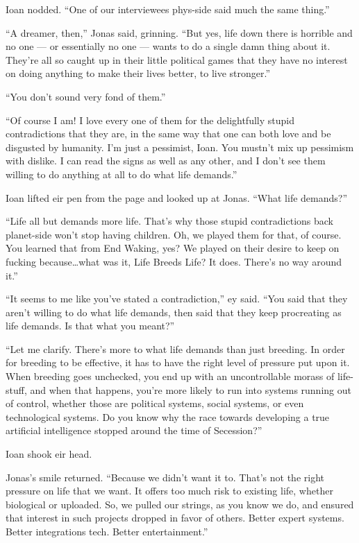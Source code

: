 Ioan nodded. ``One of our interviewees phys-side said much the same thing.''

``A dreamer, then,'' Jonas said, grinning. ``But yes, life down there is horrible and no one — or essentially no one — wants to do a single damn thing about it. They're all so caught up in their little political games that they have no interest on doing anything to make their lives better, to live stronger.''

``You don't sound very fond of them.''

``Of course I am! I love every one of them for the delightfully stupid contradictions that they are, in the same way that one can both love and be disgusted by humanity. I'm just a pessimist, Ioan. You mustn't mix up pessimism with dislike. I can read the signs as well as any other, and I don't see them willing to do anything at all to do what life demands.''

Ioan lifted eir pen from the page and looked up at Jonas. ``What life demands?''

``Life all but demands more life. That's why those stupid contradictions back planet-side won't stop having children. Oh, we played them for that, of course. You learned that from End Waking, yes? We played on their desire to keep on fucking because\ldots what was it, Life Breeds Life? It does. There's no way around it.''

``It seems to me like you've stated a contradiction,'' ey said. ``You said that they aren't willing to do what life demands, then said that they keep procreating as life demands. Is that what you meant?''

``Let me clarify. There's more to what life demands than just breeding. In order for breeding to be effective, it has to have the right level of pressure put upon it. When breeding goes unchecked, you end up with an uncontrollable morass of life-stuff, and when that happens, you're more likely to run into systems running out of control, whether those are political systems, social systems, or even technological systems. Do you know why the race towards developing a true artificial intelligence stopped around the time of Secession?''

Ioan shook eir head.

Jonas's smile returned. ``Because we didn't want it to. That's not the right pressure on life that we want. It offers too much risk to existing life, whether biological or uploaded. So, we pulled our strings, as you know we do, and ensured that interest in such projects dropped in favor of others. Better expert systems. Better integrations tech. Better entertainment.''


